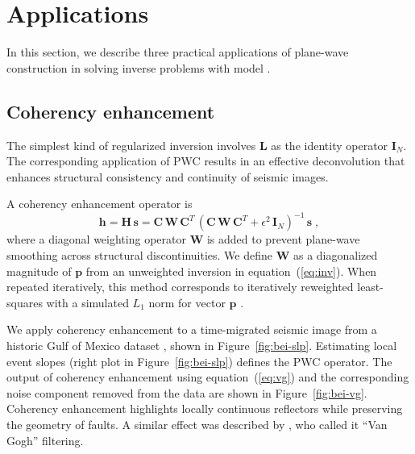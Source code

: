 \section{Applications}


In this section, we describe three practical applications of
plane-wave construction in solving inverse problems with
  model  .

\subsection{Coherency enhancement}


The simplest kind of regularized inversion involves $\mathbf{L}$ as
the identity operator $\mathbf{I}_N$. The corresponding application of
PWC   results in an
effective deconvolution that enhances structural consistency and
continuity of seismic images.

A coherency enhancement operator is
\begin{equation}
  \label{eq:vg}
  \mathbf{h = H\,s} = \mathbf{C\,W\,C}^T\,\left(\mathbf{C\,W\,C}^T + \epsilon^2\,\mathbf{I}_N\right)^{-1}\,\mathbf{s}\;,
\end{equation}
where a diagonal weighting operator $\mathbf{W}$ is added to prevent
plane-wave smoothing across structural discontinuities. We define
$\mathbf{W}$ as a diagonalized magnitude of $\mathbf{p}$ from an
unweighted inversion in equation~(\ref{eq:inv}). When repeated
iteratively, this method corresponds to iteratively reweighted
least-squares with a simulated $L_1$ norm for vector $\mathbf{p}$
\cite[]{GEO68-01-03860399}.

We apply coherency enhancement to a time-migrated seismic image from a
historic Gulf of Mexico dataset \cite[]{bei}, shown in
Figure~\ref{fig:bei-slp}.  Estimating local event slopes (right plot
in Figure~\ref{fig:bei-slp}) defines the PWC operator. The output of
coherency enhancement using equation~(\ref{eq:vg}) and the
corresponding noise component removed from the data are shown in
Figure~\ref{fig:bei-vg}. Coherency enhancement highlights locally
continuous reflectors while preserving the geometry of faults. A
similar effect was described by \cite{TLE21-03-02380243}, who called
it ``Van Gogh'' filtering.

